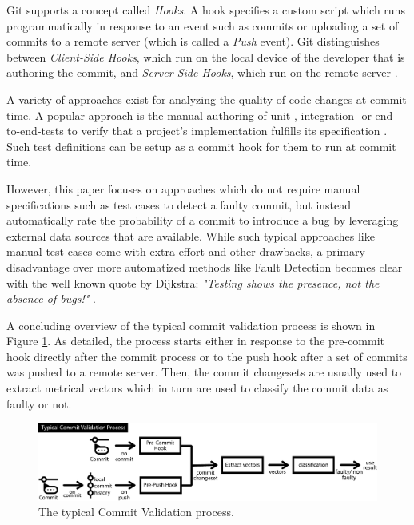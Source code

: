 Git supports a concept called \textit{Hooks}. A hook specifies a custom script which runs programmatically in response to an event such as commits or uploading a set of commits to a remote server (which is called a \textit{Push} event). 
Git distinguishes between \textit{Client-Side Hooks}, which run on the local device of the developer that is authoring the commit, and \textit{Server-Side Hooks}, which run on the remote server \cite{Chacon:2014:PG:2695634}.

A variety of approaches exist
for analyzing the quality of code changes at commit time. A popular approach is the manual authoring of unit-, integration- or end-to-end-tests to verify that a project's implementation fulfills its specification \cite{Maayan2018}. Such test definitions can be setup as a commit hook for them to run at commit time.

However, this paper focuses on approaches which do not require manual specifications such as test cases to detect a faulty commit, but instead automatically rate the probability of a commit to introduce a bug by leveraging external data sources that are available.
While such typical approaches like manual test cases come with extra effort and other drawbacks, a primary disadvantage over more automatized methods like Fault Detection becomes clear with the well known quote by Dijkstra: \textit{"Testing shows the presence, not the absence of bugs!"} \cite[p.~16]{JohnN1969}.

A concluding overview of the typical commit validation process is shown in Figure \ref{fig:cvprocess}. As detailed, the process starts either in response to the pre-commit hook directly after the commit process or to the push hook after a set of commits was pushed to a remote server. Then, the commit changesets are usually used to extract metrical vectors which in turn are used to classify the commit data as faulty or not.

\begin{figure}[t]
	\centering
	\includegraphics[width=\textwidth]{images/commitvalidation-process/typicalprocess-pdf}
	\caption{The typical Commit Validation process.}
	\label{fig:cvprocess}
\end{figure}

